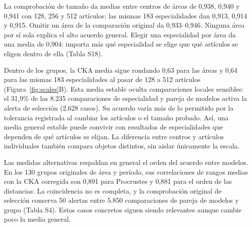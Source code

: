\documentclass[12pt]{article}
\begin{document}
La comprobación de tamaño da medias entre centros de áreas de 0,938, 0,940 y 0,941 con 128, 256 y 512 artículos; las mismas 183 especialidades dan 0,913, 0,914 y 0,915. Omitir un área de la comparación original da 0,933--0,946. Ninguna área por sí sola explica el alto acuerdo general. Elegir una especialidad por área da una media de 0,904: importa más qué especialidad se elige que qué artículos se eligen dentro de ella (Tabla S18).

Dentro de los grupos, la CKA media sigue rondando 0,63 para las áreas y 0,64 para las mismas 183 especialidades al pasar de 128 a 512 artículos (Figura~\ref{fig:scales}B). Esta media estable oculta comparaciones locales sensibles: el 31,9\% de las 8.235 comparaciones de especialidad y pareja de modelos activa la alerta de selección (2.628 casos). Su acuerdo varía más de lo permitido por la tolerancia registrada al cambiar los artículos o el tamaño probado. Así, una media general estable puede convivir con resultados de especialidades que dependen de qué artículos se elijan. La diferencia entre centros y artículos individuales también compara objetos distintos, sin aislar únicamente la escala.

Las medidas alternativas respaldan en general el orden del acuerdo entre modelos. En los 130 grupos originales de área y período, sus correlaciones de rangos medias con la CKA corregida son 0,891 para Procrustes y 0,881 para el orden de las distancias. La coincidencia no es completa, y la comprobación original de selección conserva 50 alertas entre 5.850 comparaciones de pareja de modelos y grupo (Tabla S4). Estos casos concretos siguen siendo relevantes aunque cambie poco la media general.
\end{document}
